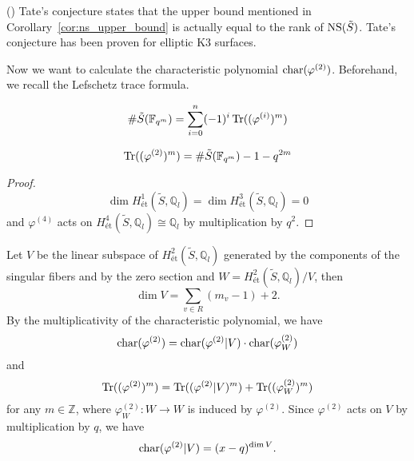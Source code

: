 \documentclass[main]{subfiles}
\begin{document}
\begin{rem}{(\cite[Remark 6.5.]{ref:vanluijk2007})}
    Tate's conjecture states that the upper bound mentioned in Corollary~\ref{cor:ns_upper_bound} is actually equal to the rank of $\operatorname{NS} (\tilde{S})$.
    Tate's conjecture has been proven for elliptic K3 surfaces.
\end{rem}

Now we want to calculate the characteristic polynomial $\operatorname{char} (\varphi^{(2)})$.
Beforehand, we recall the Lefschetz trace formula.

\begin{thm}
    \begin{equation}
        \# \tilde{S}(\mathbb{F}_{q^{m}}) = \sum_{i = 0}^{n} ( - 1)^{i} \operatorname{Tr}((\varphi^{(i)})^{m})
    \end{equation}
\end{thm}

\begin{cor}
    \label{cor:lefschetz}
    \begin{equation}
        \operatorname{Tr} ((\varphi^{(2)})^{m}) = \# \tilde{S}(\mathbb{F}_{q^{m}}) - 1 - q^{2m}
    \end{equation}
\end{cor}
\begin{proof}
    \begin{equation}
        \dim H_{\text{\'et}}^{1}(\tilde{S}, \mathbb{Q}_l) = \dim H_{\text{\'et}}^{3}(\tilde{S}, \mathbb{Q}_l) = 0
    \end{equation}
    and $\varphi^{(4)}$ acts on $H_{\text{\'et}}^{4}(\tilde{S}, \mathbb{Q}_l) \cong \mathbb{Q}_l$ by multiplication by $q^{2}$.
\end{proof}

Let $V$ be the linear subspace of $H_{\text{\'et}}^{2}(\tilde{S}, \mathbb{Q}_{l})$ generated by the components of the singular fibers and by the zero section and $W = H_{\text{\'et}}^{2}(\tilde{S}, \mathbb{Q}_l) / V$, then
\begin{equation}
    \dim V = \sum_{v \in R} (m_{v} - 1) + 2.
\end{equation}
By the multiplicativity of the characteristic polynomial, we have
\begin{equation}
    \operatorname{char} (\varphi^{(2)}) = \operatorname{char} (\varphi^{(2)} | V) \cdot \operatorname{char} (\varphi^{(2)}_{W})
\end{equation}
and
\begin{equation}
    \operatorname{Tr} ((\varphi^{(2)})^{m}) = \operatorname{Tr} ((\varphi^{(2)} | V)^{m}) + \operatorname{Tr} ((\varphi^{(2)}_{W})^{m}) \label{eq:tr-composition}
\end{equation}
for any $m \in \mathbb{Z}$, where $\varphi^{(2)}_W: W \to W$ is induced by $\varphi^{(2)}$.
Since $\varphi^{(2)}$ acts on $V$ by multiplication by $q$, we have
\begin{equation}
    \operatorname{char} (\varphi^{(2)} | V) = (x - q)^{\dim V}.
\end{equation}
\end{document}
